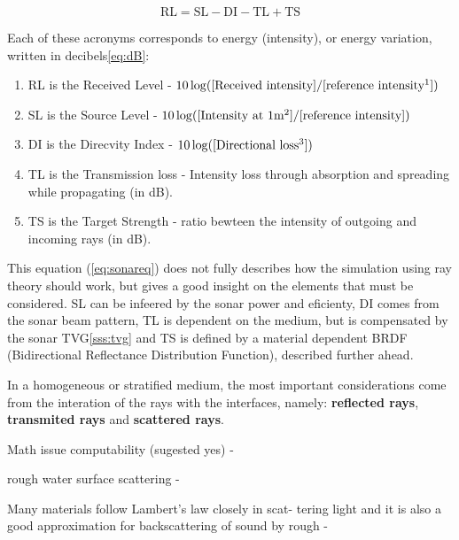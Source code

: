 \begin{equation}
\label{eq:sonareq}
\text{RL} = \text{SL} - \text{DI} - \text{TL} + \text{TS}
\end{equation}

Each of these acronyms corresponds to energy (intensity), or energy variation,
written in decibels\ref{eq:dB}:
\begin{enumerate}
  \item RL is the Received Level - $10\log([\text{Received
  intensity}]/[\text{reference intensity\footnotemark}])$
  \item SL is the Source Level - $10\log([\text{Intensity at
  1m\footnotemark}]/[\text{reference
  intensity}])$
  \item DI is the Direcvity Index - $10\log([\text{Directional
  loss\footnotemark}])$
  \item TL is the Transmission loss - Intensity loss through absorption and
  spreading while propagating (in dB).
  \item TS is the Target Strength - ratio bewteen the intensity of outgoing
  and incoming rays (in dB).
\end{enumerate}



This equation (\ref{eq:sonareq}) does not fully describes how the simulation
using ray theory should work, but gives a good insight on the elements that must
be considered. SL can be infeered by the sonar power and eficienty, DI comes
from the sonar beam pattern, TL is dependent on the medium, but is compensated
by the sonar TVG\ref{sss:tvg} and TS is defined by a material dependent BRDF
(Bidirectional Reflectance Distribution Function), described further ahead.

In a homogeneous or stratified medium, the most important considerations come
from the interation of the rays with the interfaces, namely: \textbf{reflected rays},
\textbf{transmited rays} and \textbf{scattered rays}.



Math issue computability (sugested yes) -
\citet{reif1994computability,blakey2014ray}

rough water surface scattering - \citet{jones2009modelling}

Many materials follow Lambert's law closely in scat-
tering light and it is also a good approximation for
backscattering of sound by rough - \citet{blake1995remote}

